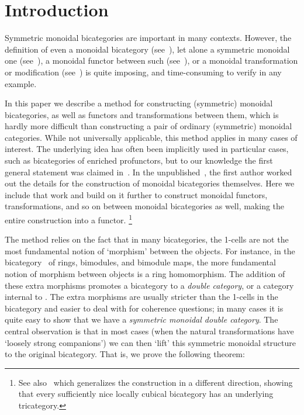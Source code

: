 \section{Introduction}
\label{sec:introduction}

Symmetric monoidal bicategories are important in many contexts.
However, the definition of even a monoidal bicategory
(see~\cite{gps:tricats,nick:tricats}), let alone a symmetric monoidal
one
(see~\cite{kv:2cat-zam,kv:bm2cat,bn:hda-i,ds:monbi-hopfagbd,crans:centers,mccrudden:bal-coalgb,gurski:brmonbicat}),
a monoidal functor between such (see~\cite{nick:tricatsbook,mccrudden:bal-coalgb}),
or a monoidal transformation or modification (see~\cite{sp:thesis})
is quite imposing, and time-consuming to verify in any example.

In this paper we describe a method for constructing (symmetric) monoidal
bicategories, as well as functors and transformations between them, which is hardly more difficult than constructing a pair
of ordinary (symmetric) monoidal categories.
While not universally applicable, this method applies in many cases of interest.
The underlying idea has often been implicitly used in particular cases, such as
bicategories of enriched profunctors, but to our knowledge the first
general statement was claimed in~\cite[Appendix B]{shulman:frbi}.
In the unpublished~\cite{shulman:smbicat}, the first author worked out the details for the construction of monoidal bicategories themselves.
Here we include that work and build on it further to construct monoidal functors, transformations, and so on between monoidal bicategories as well, making the entire construction into a functor.%
\footnote{See also~\cite[\S5]{gg:ldstr-tricat} which generalizes the construction in a different direction, showing that every sufficiently nice locally cubical bicategory has an underlying tricategory.}

The method relies on the fact that in many bicategories, the 1-cells
are not the most fundamental notion of `morphism' between the objects.
For instance, in the bicategory \cMod\ of rings, bimodules, and
bimodule maps, the more fundamental notion of morphism between objects
is a ring homomorphism. The addition of these extra morphisms promotes
a bicategory to a \emph{double category}, or a category internal to
\cCat.  The extra morphisms are usually stricter than the 1-cells in
the bicategory and easier to deal with for coherence questions; in
many cases it is quite easy to show that we have a \emph{symmetric
  monoidal double category}.  The central observation is that in most
cases (when the natural transformations have `loosely strong companions') we can then `lift' this
symmetric monoidal structure to the original bicategory.  That is, we
prove the following theorem:

